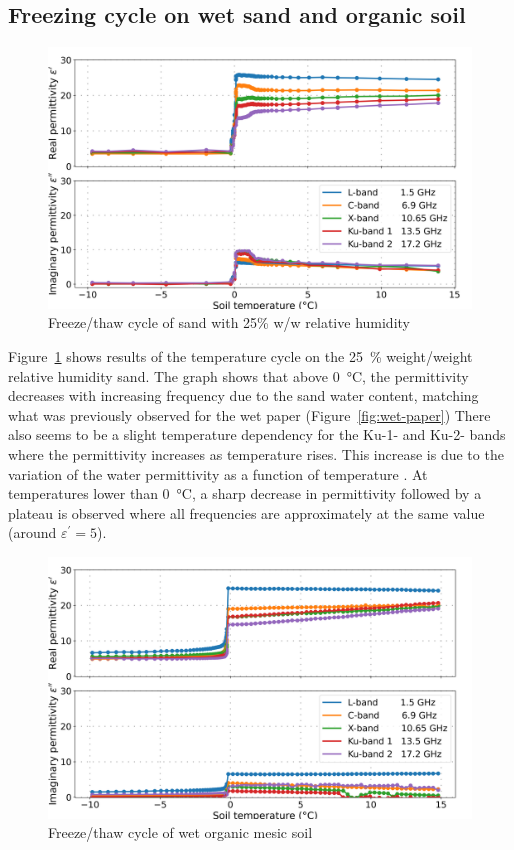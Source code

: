 \subsection{Freezing cycle on wet sand and organic soil}

\begin{figure}[ht!]
    \centering
    \includegraphics[width=\columnwidth]{Images/wet-sand.png}
    \caption[]{Freeze/thaw cycle of sand with 25\% w/w relative humidity}\label{fig:wet-sand}
\end{figure}

Figure~\ref{fig:wet-sand} shows results of the temperature cycle on the \qty{25}{\percent} weight/weight relative humidity sand.
The graph shows that above \qty{0}{\degreeCelsius}, the permittivity decreases with increasing frequency due to the sand water content, matching what was previously observed for the wet paper (Figure~\ref{fig:wet-paper})
There also seems to be a slight temperature dependency for the Ku-1- and Ku-2- bands where the permittivity increases as temperature rises.
This increase is due to the variation of the water permittivity as a function of temperature \parencite{Kaatze1989}.
At temperatures lower than \qty{0}{\degreeCelsius}, a sharp decrease in permittivity followed by a plateau is observed where all frequencies are approximately at the same value (around \(\varepsilon^\prime = 5\)).

\begin{figure}[ht!]
    \centering
    \includegraphics[width=\columnwidth]{Images/wet-soil.png}
    \caption[]{Freeze/thaw cycle of wet organic mesic soil}\label{fig:wet-soil}
\end{figure}

